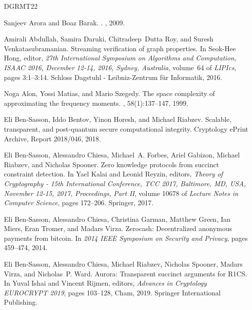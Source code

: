 \documentclass[10pt,a4paper]{article}
\theoremstyle{definition}
\begin{document}
\newcommand{\etalchar}[1]{$^{#1}$}
\begin{thebibliography}{DGRMT22}

Sanjeev Arora and Boaz Barak.
.
, 2009.

Amirali Abdullah, Samira Daruki, Chitradeep~Dutta Roy, and Suresh Venkatasubramanian.
\newblock Streaming verification of graph properties.
\newblock In Seok-Hee Hong, editor, {\em 27th International Symposium on Algorithms and Computation, {{ISAAC}} 2016, December 12-14, 2016, Sydney, Australia}, volume~64 of {\em {{LIPIcs}}}, pages 3:1--3:14. {Schloss Dagstuhl - Leibniz-Zentrum f\"ur Informatik}, 2016.

Noga Alon, Yossi Matias, and Mario Szegedy.
\newblock The space complexity of approximating the frequency moments.
, 58(1):137--147, 1999.

Eli {Ben-Sasson}, Iddo Bentov, Yinon Horesh, and Michael Riabzev.
\newblock Scalable, transparent, and post-quantum secure computational integrity.
\newblock Cryptology ePrint Archive, Report 2018/046, 2018.

\bibitem[BCF{\etalchar{+}}17]{BCFGRS17}
Eli {Ben-Sasson}, Alessandro Chiesa, Michael~A. Forbes, Ariel Gabizon, Michael Riabzev, and Nicholas Spooner.
\newblock Zero knowledge protocols from succinct constraint detection.
\newblock In Yael Kalai and Leonid Reyzin, editors, {\em Theory of Cryptography - 15th International Conference, {{TCC}} 2017, Baltimore, {{MD}}, {{USA}}, November 12-15, 2017, Proceedings, Part {{II}}}, volume 10678 of {\em Lecture Notes in Computer Science}, pages 172--206. {Springer}, 2017.

\bibitem[BCG{\etalchar{+}}14]{BCGGMTV14}
Eli {Ben-Sasson}, Alessandro Chiesa, Christina Garman, Matthew Green, Ian Miers, Eran Tromer, and Madars Virza.
\newblock Zerocash: {{Decentralized}} anonymous payments from bitcoin.
\newblock In {\em 2014 {{IEEE}} Symposium on Security and Privacy}, pages 459--474, 2014.

\bibitem[BCR{\etalchar{+}}19]{BCRSVW19}
Eli {Ben-Sasson}, Alessandro Chiesa, Michael Riabzev, Nicholas Spooner, Madars Virza, and Nicholas~P. Ward.
\newblock Aurora: Transparent succinct arguments for {{R1CS}}.
\newblock In Yuval Ishai and Vincent Rijmen, editors, {\em Advances in Cryptology \textendash{} {{EUROCRYPT}} 2019}, pages 103--128, {Cham}, 2019. {Springer International Publishing}.


\end{thebibliography}
\end{document}
